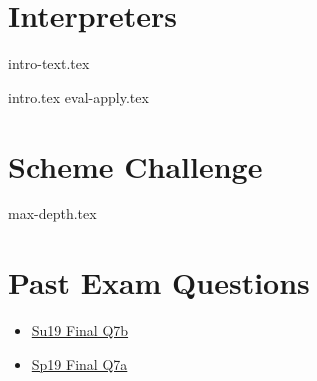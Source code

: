 \documentclass{exam}
\begin{document}
\newpage
\section{Interpreters}
{intro-text.tex}
\begin{questions}
    {intro.tex}
    {eval-apply.tex}
\end{questions}

\section{Scheme Challenge}
\begin{questions}
{max-depth.tex}
\end{questions}

\newpage
\section{Past Exam Questions}
\begin{itemize}
    \item \href{https://cs61a.org/exam/su19/final/61a-su19-final.pdf#page=10}{Su19 Final Q7b}
    \item \href{https://cs61a.org/exam/sp19/final/61a-sp19-final.pdf#page=8}{Sp19 Final Q7a}
\end{itemize}

\end{document}
